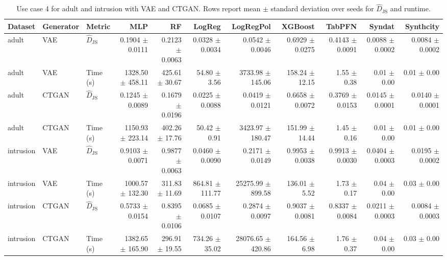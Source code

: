 \begin{table}[ht]
\centering
\scriptsize
\setlength{\tabcolsep}{2.2pt}
\caption{Use case 4 for adult and intrusion with VAE and CTGAN. Rows report mean $\pm$ standard deviation over seeds for $\widehat{D}_{\mathrm{JS}}$ and runtime.}
\label{tab:uc4_adult_intrusion_vae_ctgan_mean_std}
\begin{tabular}{lllrrrrrrrr}
\toprule
Dataset & Generator & Metric & MLP & RF & LogReg & LogRegPol & XGBoost & TabPFN & Syndat & Synthcity \\
\midrule
adult & VAE & $\widehat{D}_{\mathrm{JS}}$ & 0.1904 $\pm$ 0.0111 & 0.2123 $\pm$ 0.0063 & 0.0328 $\pm$ 0.0034 & 0.0542 $\pm$ 0.0046 & 0.6929 $\pm$ 0.0275 & 0.4143 $\pm$ 0.0091 & 0.0088 $\pm$ 0.0002 & 0.0084 $\pm$ 0.0002 \\
adult & VAE & Time (s) & 1328.50 $\pm$ 458.11 & 425.61 $\pm$ 30.67 & 54.80 $\pm$ 3.56 & 3733.98 $\pm$ 145.06 & 158.24 $\pm$ 12.15 & 1.55 $\pm$ 0.38 & 0.01 $\pm$ 0.00 & 0.01 $\pm$ 0.00 \\
adult & CTGAN & $\widehat{D}_{\mathrm{JS}}$ & 0.1245 $\pm$ 0.0089 & 0.1679 $\pm$ 0.0196 & 0.0225 $\pm$ 0.0088 & 0.0419 $\pm$ 0.0121 & 0.6658 $\pm$ 0.0072 & 0.3769 $\pm$ 0.0153 & 0.0145 $\pm$ 0.0001 & 0.0140 $\pm$ 0.0001 \\
adult & CTGAN & Time (s) & 1150.93 $\pm$ 223.14 & 402.26 $\pm$ 17.76 & 50.42 $\pm$ 0.91 & 3423.97 $\pm$ 180.47 & 151.99 $\pm$ 14.44 & 1.45 $\pm$ 0.16 & 0.01 $\pm$ 0.00 & 0.01 $\pm$ 0.00 \\
intrusion & VAE & $\widehat{D}_{\mathrm{JS}}$ & 0.9103 $\pm$ 0.0071 & 0.9877 $\pm$ 0.0063 & 0.0460 $\pm$ 0.0090 & 0.2171 $\pm$ 0.0149 & 0.9953 $\pm$ 0.0038 & 0.9913 $\pm$ 0.0030 & 0.0404 $\pm$ 0.0003 & 0.0195 $\pm$ 0.0002 \\
intrusion & VAE & Time (s) & 1000.57 $\pm$ 132.30 & 311.83 $\pm$ 11.69 & 864.81 $\pm$ 111.77 & 25275.99 $\pm$ 899.58 & 136.01 $\pm$ 5.52 & 1.73 $\pm$ 0.17 & 0.04 $\pm$ 0.00 & 0.03 $\pm$ 0.00 \\
intrusion & CTGAN & $\widehat{D}_{\mathrm{JS}}$ & 0.5733 $\pm$ 0.0154 & 0.8395 $\pm$ 0.0106 & 0.0685 $\pm$ 0.0107 & 0.2874 $\pm$ 0.0097 & 0.9037 $\pm$ 0.0081 & 0.8337 $\pm$ 0.0084 & 0.0211 $\pm$ 0.0003 & 0.0084 $\pm$ 0.0003 \\
intrusion & CTGAN & Time (s) & 1382.65 $\pm$ 165.90 & 296.91 $\pm$ 19.55 & 734.26 $\pm$ 35.02 & 28076.65 $\pm$ 420.86 & 164.56 $\pm$ 6.98 & 1.76 $\pm$ 0.37 & 0.04 $\pm$ 0.00 & 0.03 $\pm$ 0.00 \\
\bottomrule
\end{tabular}
\end{table}